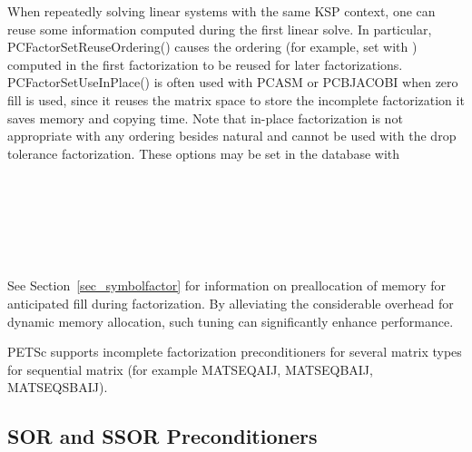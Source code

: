 When repeatedly solving linear systems with the same KSP
context, one can reuse some information  computed
during the first linear solve.
In particular, PCFactorSetReuseOrdering() causes the ordering  (for example, set with 
 ) computed in the first factorization to be reused
for later factorizations.  
PCFactorSetUseInPlace() is often used with 
PCASM or PCBJACOBI when zero fill is used, since it reuses the 
matrix space to store the incomplete factorization it saves memory and 
copying time. Note that in-place factorization is not appropriate with 
any ordering besides natural and cannot be used with the drop tolerance
factorization. These options may be set in the database with 
\begin{tabbing}
   \\
   \\
   \\
   \\
   \\
\end{tabbing}
 
 

See Section~\ref{sec_symbolfactor} for information on preallocation
of memory for anticipated fill during factorization.
By alleviating the considerable overhead for dynamic memory allocation,
such tuning can significantly enhance performance.

\label{sec_pcfactor}
PETSc supports incomplete factorization preconditioners for several matrix
types for sequential matrix (for example MATSEQAIJ, MATSEQBAIJ, MATSEQSBAIJ).



\subsection{SOR and SSOR Preconditioners}

